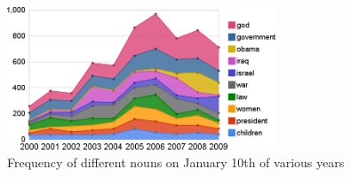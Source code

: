 
\begin{figure}[tb]
	\begin{center}
	\includegraphics[width=8cm]{images/year_nouns.png}
	\caption{Frequency of different nouns on January 10th of various years}
	\label{year_nouns}
	\end{center}
\end{figure}

